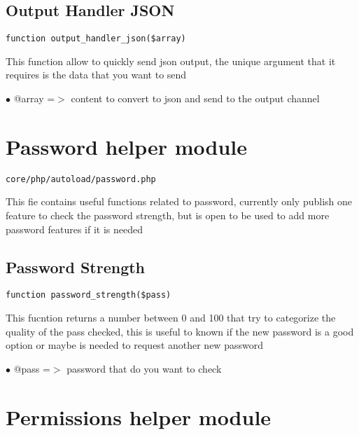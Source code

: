 \documentclass[a4paper]{book}
\begin{document}
\subsection{Output Handler JSON}

\begin{lstlisting}
function output_handler_json($array)
\end{lstlisting}

This function allow to quickly send json output, the unique argument that it
requires is the data that you want to send

\begin{compactitem}
\item[\color{myblue}$\bullet$] @array =$>$ content to convert to json and send to the output channel
\end{compactitem}

\hypertarget{toc201}{}
\section{Password helper module}

\begin{lstlisting}
core/php/autoload/password.php
\end{lstlisting}

This fie contains useful functions related to password, currently only publish one feature to check
the password strength, but is open to be used to add more password features if it is needed

\hypertarget{toc202}{}
\subsection{Password Strength}

\begin{lstlisting}
function password_strength($pass)
\end{lstlisting}

This fucntion returns a number between 0 and 100 that try to categorize
the quality of the pass checked, this is useful to known if the new
password is a good option or maybe is needed to request another new
password

\begin{compactitem}
\item[\color{myblue}$\bullet$] @pass =$>$ password that do you want to check
\end{compactitem}

\hypertarget{toc203}{}
\section{Permissions helper module}
\end{document}
